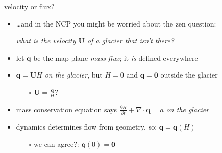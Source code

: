 \documentclass[10pt,hyperref,dvipsnames]{beamer}
\newcommand{\bq}{\mathbf{q}}
\newcommand{\bU}{\mathbf{U}}
\newcommand{\bzero}{\bm{0}}
\newcommand{\Div}{\nabla\cdot}
\begin{document}
\begin{frame}{velocity or flux?}
\begin{itemize}
\item \dots and in the NCP you might be worried about the zen question:

\begin{center}
\emph{what is the velocity $\bU$ of a glacier that isn't there?}
\end{center}

\vspace{5mm}
\item<2> let $\bq$ be the map-plane \emph{mass flux}; it \emph{is} defined everywhere

\medskip
\item<2> \alert{$\bq = \bU H$ \emph{on the glacier}, but $H=0$ and $\bq=\bzero$ outside the glacier}
    \begin{itemize}
    \item[$\circ$] $\bU=\frac{\bq}{H}$?
    \end{itemize}

\medskip
\item<2> mass conservation equation says \quad $\frac{\partial H}{\partial t} + \Div \bq = a$ \quad \emph{on the glacier}

\medskip
\item<2> dynamics determines flow from geometry, so: \quad $\bq=\bq(H)$
    \begin{itemize}
    \item[$\circ$] we can agree?: \quad $\bq(0)=\bzero$
    \end{itemize}
\end{itemize}
\end{frame}
\end{document}
